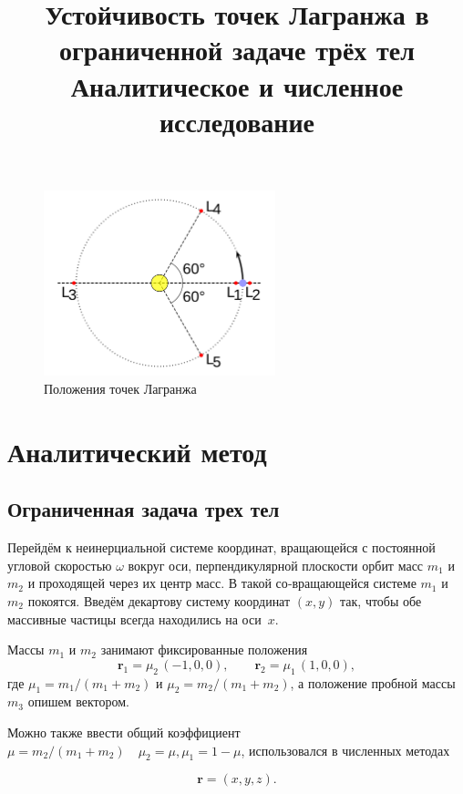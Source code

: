 \documentclass[12pt]{article}
\title{Устойчивость точек Лагранжа в ограниченной задаче трёх тел\\\small Аналитическое и численное исследование}
\author{}
\date{}
\newcommand{\rvec}{\mathbf r}
\newcommand{\rone}{\mathbf r_1}
\newcommand{\rtwo}{\mathbf r_2}
\newcommand{\muone}{\mu_1}
\newcommand{\mutwo}{\mu_2}
\begin{document}
\maketitle
\tableofcontents
\bigskip

\begin{figure}[H]
  \centering
  \includegraphics[width=0.6\textwidth]{image.png}
  \caption{Положения точек Лагранжа}
  \label{fig:lagr}
\end{figure}

\section{Аналитический метод}
\subsection{Ограниченная задача трех тел}\label{sec:corot}

Перейдём к неинерциальной системе координат, вращающейся с постоянной угловой скоростью $\omega$ вокруг оси, перпендикулярной плоскости орбит масс $m_1$ и $m_2$ и проходящей через их центр масс. В такой со‑вращающейся системе $m_1$ и $m_2$ покоятся. Введём декартову систему координат $(x,y)$ так, чтобы обе массивные частицы всегда находились на оси~$x$.

Массы $m_1$ и $m_2$ занимают фиксированные положения
\begin{equation}\label{eq:r1r2}
  \rone = \mutwo\,(-1,0,0),\qquad
  \rtwo = \muone\,(1,0,0),
\end{equation}
где $\mu_1=m_1/(m_1+m_2)$ и $\mu_2=m_2/(m_1+m_2)$, а положение пробной массы $m_3$ опишем вектором. 

Можно также ввести общий коэффициент $ \mu=m_2/(m_1+m_2) \quad \mu_2 = \mu, \mu_1 = 1 - \mu$, использовался в численных методах

\begin{equation}\label{eq:rvec}
  \rvec = (x,y,z).
\end{equation}
\end{document}
